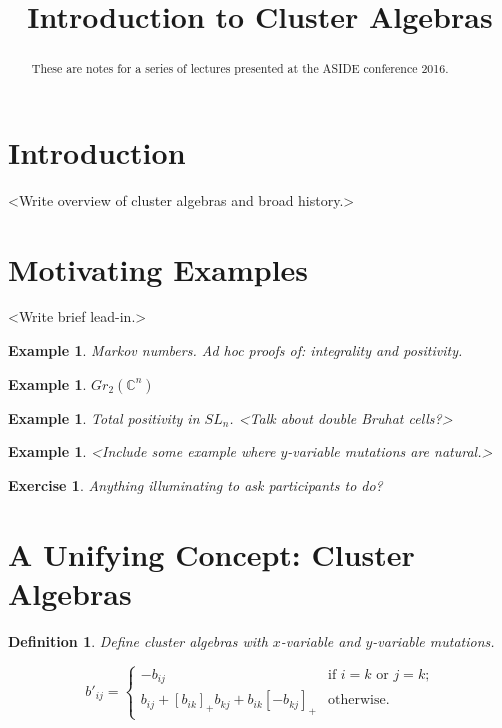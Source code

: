\documentclass{amsart}
\title{Introduction to Cluster Algebras}
\newtheorem{definition}[theorem]{Definition}
\newtheorem{example}[theorem]{Example}
\newtheorem{exercise}[theorem]{Exercise}
\theoremstyle{remark}
\numberwithin{equation}{section}
\newcommand{\CC}{\mathbb{C}}
\begin{document}
\begin{abstract}
  These are notes for a series of lectures presented at the ASIDE conference 2016.
\end{abstract}
\maketitle

\section{Introduction}
  <Write overview of cluster algebras and broad history.>

\section{Motivating Examples}
  <Write brief lead-in.>

  \begin{example}
    Markov numbers. Ad hoc proofs of: integrality and positivity.
  \end{example}

  \begin{example}
    $Gr_{2}(\CC^n)$
  \end{example}
  
  \begin{example}
    Total positivity in $SL_n$.  <Talk about double Bruhat cells?>
  \end{example}

  \begin{example}
    <Include some example where $y$-variable mutations are natural.>
  \end{example}

  \begin{exercise}
    Anything illuminating to ask participants to do?
  \end{exercise}

\section{A Unifying Concept: Cluster Algebras}

  \begin{definition}
    Define cluster algebras with $x$-variable and $y$-variable mutations.

    \begin{equation}\label{eq:matrix mutation}
      b'_{ij}=\begin{cases}
                 -b_{ij} & \text{if $i=k$ or $j=k$;}\\
                 b_{ij}+[b_{ik}]_+b_{kj}+b_{ik}[-b_{kj}]_+ & \text{otherwise.}
               \end{cases}
    \end{equation}
  \end{definition}
\end{document}
